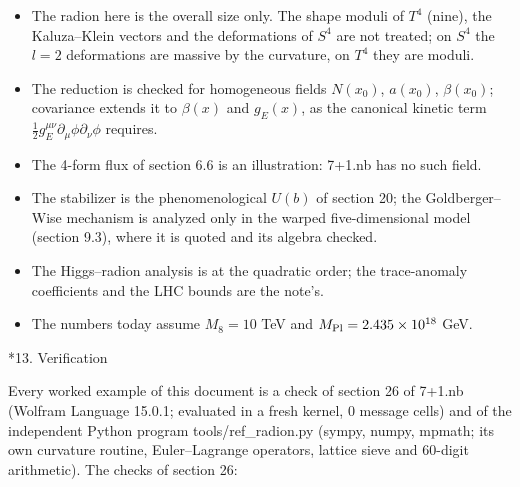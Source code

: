\documentclass[10pt,a4paper]{article}
\makeatletter
\renewcommand\section{\@startsection{section}{1}{\z@}{-3.5ex \@plus -1ex \@minus -.2ex}{2.3ex \@plus.2ex}{\normalfont\Large\bfseries\raggedright}}
\makeatother
\begin{document}
\begin{itemize}
\item The radion here is the overall size only. The shape moduli of $T^4$ (nine), the Kaluza–Klein vectors and the deformations of $S^4$ are not treated; on $S^4$ the $l=2$ deformations are massive by the curvature, on $T^4$ they are moduli.
\item The reduction is checked for homogeneous fields $N(x_0)$, $a(x_0)$, $\beta(x_0)$; covariance extends it to $\beta(x)$ and $g_E(x)$, as the canonical kinetic term $\frac12g_E^{\mu\nu}\partial_\mu\phi\partial_\nu\phi$ requires.
\item The 4-form flux of section 6.6 is an illustration: 7+1.nb has no such field.
\item The stabilizer is the phenomenological $U(b)$ of section 20; the Goldberger–Wise mechanism is analyzed only in the warped five-dimensional model (section 9.3), where it is quoted and its algebra checked.
\item The Higgs–radion analysis is at the quadratic order; the trace-anomaly coefficients and the LHC bounds are the note’s.
\item The numbers today assume $M_8=10$ TeV and $M_{\rm Pl}=2.435\times10^{18}$ GeV.
\end{itemize}
\section*{13. Verification}
Every worked example of this document is a check of section 26 of 7+1.nb (Wolfram Language 15.0.1; evaluated in a fresh kernel, 0 message cells) and of the independent Python program tools/ref\_radion.py (sympy, numpy, mpmath; its own curvature routine, Euler–Lagrange operators, lattice sieve and 60-digit arithmetic). The checks of section 26:
\end{document}
